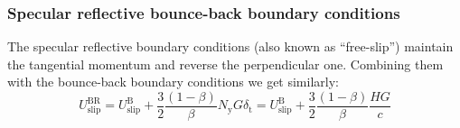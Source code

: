 \subsubsection{Specular reflective bounce-back boundary conditions}
The specular reflective boundary conditions (also known as ``free-slip'') maintain the
tangential momentum and reverse the perpendicular one. Combining them with the bounce-back boundary
conditions we get similarly:
\begin{equation}
 U_\mathrm{slip}^\mathrm{BR} = U_\mathrm{slip}^\mathrm{B} + \frac{3}{2} \frac{(1-\beta)}{\beta} N_\mathrm{y} G \delta_\mathrm{t}
 = U_\mathrm{slip}^\mathrm{B} + \frac{3}{2} \frac{(1-\beta)}{\beta} \frac{H G}{c}
\end{equation}







